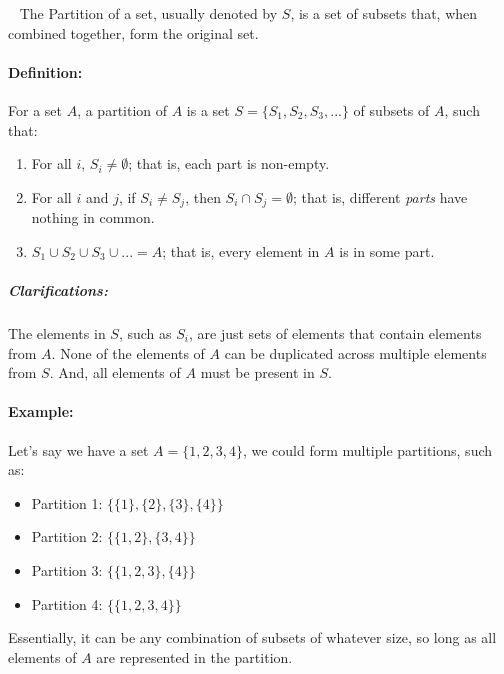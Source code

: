 \documentclass[a4paper,12pt]{book}
\begin{document}
    \begin{intro}{\ }
        The Partition of a set, usually denoted by $S$, is a set of subsets
        that, when combined together, form the original set.

        \paragraph{Definition:}
            For a set $A$, a partition of $A$ is a set $S = \{ S_{1}, S_{2}, S_{3}, ... \}$
            of subsets of $A$, such that:
            \begin{enumerate}
                \item   For all $i$, $S_{i} \neq \emptyset$; that is, each part is non-empty.
                \item   For all $i$ and $j$, if $S_{i} \neq S_{j}$, then $S_{i} \cap S_{j} = \emptyset$;{}
                    that is, different \textit{parts} have nothing in common.
                \item   $S_{1} \cup S_{2} \cup S_{3} \cup ... = A$; that is,
                    every element in $A$ is in some part.
            \end{enumerate}

            \subparagraph{Clarifications:}
                The elements in $S$, such as $S_{i}$, are just sets of elements that
                contain elements from $A$. None of the elements of $A$ can be duplicated
                across multiple elements from $S$. And, all elements of $A$ must be
                present in $S$.


            \paragraph{Example:}
                Let's say we have a set $A = \{1, 2, 3, 4\}$, we could form multiple partitions, such as:

                \begin{itemize}
                    \item   Partition 1:    $\{ \{1\}, \{2\}, \{3\}, \{4\} \}$
                    \item   Partition 2:    $\{ \{1, 2\}, \{3, 4\} \}$
                    \item   Partition 3:    $\{ \{1, 2, 3\}, \{4\} \}$
                    \item   Partition 4:    $\{ \{1, 2, 3, 4\} \}$
                \end{itemize}

                Essentially, it can be any combination of subsets of whatever size,
                so long as all elements of $A$ are represented in the partition.
    \end{intro}
\end{document}
